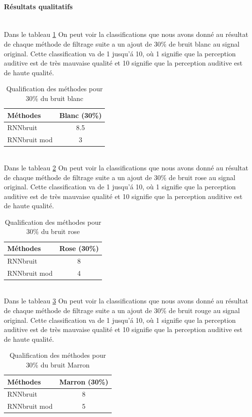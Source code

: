 \documentclass[conference,onecolumn]{IEEEtran}
\begin{document}
\paragraph{Résultats qualitatifs}
\hfill \\
Dans le tableau \ref{table:t16} On peut voir la classifications que nous avons donné au résultat de chaque méthode de filtrage suite a un ajout de 30\% de bruit blanc au signal original. Cette classification va de 1 jusqu'á 10, où 1 signifie que la perception auditive est de très mauvaise qualité et 10 signifie que la perception auditive est de haute qualité.
\begin{table}[hbt!]
    \centering
    \begin{tabular}{ l  c }
    \textbf{Méthodes} & \textbf{Blanc (30\%)} \\
    \hline
    RNNbruit &  8.5 \\
    RNNbruit mod &  3 \\
    \end{tabular}
    \caption{Qualification des méthodes pour 30\% du bruit blanc}
    \label{table:t16}
\end{table}
\hfill \\
Dans le tableau \ref{table:t17} On peut voir la classifications que nous avons donné au résultat de chaque méthode de filtrage suite a un ajout de 30\% de bruit rose au signal original. Cette classification va de 1 jusqu'á 10, où 1 signifie que la perception auditive est de très mauvaise qualité et 10 signifie que la perception auditive est de haute qualité.  
\begin{table}[hbt!]
    \centering
    \begin{tabular}{ l  c }
    \textbf{Méthodes} & \textbf{Rose (30\%)} \\
    \hline
    RNNbruit &  8 \\
    RNNbruit mod &  4 \\
    \end{tabular}
    \caption{Qualification des méthodes pour 30\% du bruit rose}
    \label{table:t17}
\end{table}
\hfill \\
Dans le tableau \ref{table:t18} On peut voir la classifications que nous avons donné au résultat de chaque méthode de filtrage suite a un ajout de 30\% de bruit rouge au signal original. Cette classification va de 1 jusqu'á 10, où 1 signifie que la perception auditive est de très mauvaise qualité et 10 signifie que la perception auditive est de haute qualité.
\begin{table}[hbt!]
    \centering
    \begin{tabular}{ l  c }
    \textbf{Méthodes} & \textbf{Marron (30\%)} \\
    \hline
    RNNbruit & 8 \\
    RNNbruit mod &  5 \\
    \end{tabular}
    \caption{Qualification des méthodes pour 30\% du bruit Marron}
    \label{table:t18}
\end{table}
\hfill \\
\end{document}
